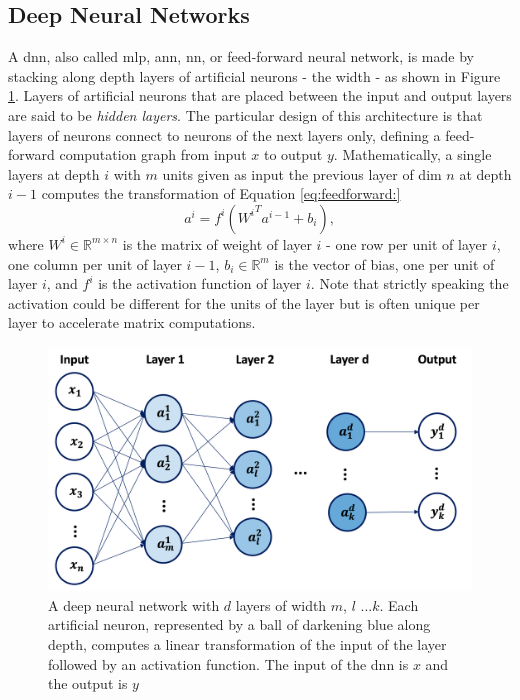 \subsection{Deep Neural Networks}
A \gls{dnn}, also called \gls{mlp}, \gls{ann}, \gls{nn}, or feed-forward neural network, is made by stacking along depth layers of artificial neurons - the width - as shown in Figure \ref{fig:neuralnet}. Layers of artificial neurons that are placed between the input and output layers are said to be \textit{hidden layers}. The particular design of this architecture is that layers of neurons connect to neurons of the next layers only, defining a feed-forward computation graph from input $x$ to output $y$. Mathematically, a single layers at depth $i$ with $m$ units given as input the previous layer of dim $n$ at depth $i-1$ computes the  transformation of Equation \ref{eq:feedforward:}
\begin{equation}\label{eq:feedforward}
    a^i = f^i\left({W^i}^T a^{i-1} + b_i\right),
\end{equation}
where $W^i \in \mathbb{R}^{m \times n}$ is the matrix of weight of layer $i$ - one row per unit of layer $i$, one column per unit of layer $i-1$, $b_i \in \mathbb{R}^m$ is the vector of bias, one per unit of layer $i$, and $f^i$ is the activation function of layer $i$. Note that strictly speaking the activation could be different for the units of the layer but is often unique per layer to accelerate matrix computations.

\begin{figure}[h!]
    \center
    \begin{minipage}[l]{0.38\textwidth}
        \caption{A deep neural network with $d$ layers of width $m$, $l$ ...$k$. Each artificial neuron, represented by a ball of darkening blue along depth, computes a linear transformation of the input of the layer followed by an activation function. The input of the \gls{dnn} is $x$ and the output is $y$} 
    \label{fig:neuralnet}
      \end{minipage}
      \begin{minipage}[c]{0.6\textwidth}
        \includegraphics[width=\textwidth]{Images/ML/neuralnet.png}
      \end{minipage}
\end{figure}

